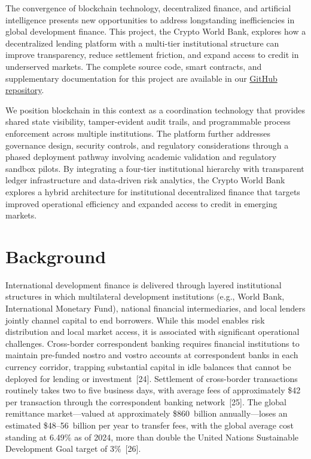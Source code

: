 \documentclass[12pt,a4paper]{report}
\begin{document}
The convergence of blockchain technology, decentralized finance, and artificial intelligence presents new opportunities to address longstanding inefficiencies in global development finance. This project, the Crypto World Bank, explores how a decentralized lending platform with a multi-tier institutional structure can improve transparency, reduce settlement friction, and expand access to credit in underserved markets. The complete source code, smart contracts, and supplementary documentation for this project are available in our \href{https://github.com/Yuvraajrahman/Cryto-World-Bank}{GitHub repository}.

We position blockchain in this context as a coordination technology that provides shared state visibility, tamper-evident audit trails, and programmable process enforcement across multiple institutions. The platform further addresses governance design, security controls, and regulatory considerations through a phased deployment pathway involving academic validation and regulatory sandbox pilots. By integrating a four-tier institutional hierarchy with transparent ledger infrastructure and data-driven risk analytics, the Crypto World Bank explores a hybrid architecture for institutional decentralized finance that targets improved operational efficiency and expanded access to credit in emerging markets.

\section{Background}

International development finance is delivered through layered institutional structures in which multilateral development institutions (e.g., World Bank, International Monetary Fund), national financial intermediaries, and local lenders jointly channel capital to end borrowers. While this model enables risk distribution and local market access, it is associated with significant operational challenges. Cross-border correspondent banking requires financial institutions to maintain pre-funded nostro and vostro accounts at correspondent banks in each currency corridor, trapping substantial capital in idle balances that cannot be deployed for lending or investment~[24]. Settlement of cross-border transactions routinely takes two to five business days, with average fees of approximately \$42 per transaction through the correspondent banking network~[25]. The global remittance market---valued at approximately \$860~billion annually---loses an estimated \$48--56~billion per year to transfer fees, with the global average cost standing at 6.49\% as of 2024, more than double the United Nations Sustainable Development Goal target of 3\%~[26].
\end{document}
